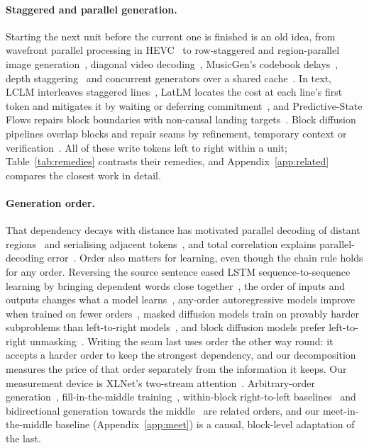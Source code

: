 \documentclass{article}
\theoremstyle{definition}
\theoremstyle{remark}
\begin{document}
\paragraph{Staggered and parallel generation.}
Starting the next unit before the current one is finished is an old idea, from wavefront parallel processing in HEVC~\citep{sullivan2012hevc} to row-staggered and region-parallel image generation~\citep{he2025zipar,wang2025par}, diagonal video decoding~\citep{ye2025diagonal}, MusicGen's codebook delays~\citep{copet2023musicgen}, depth staggering~\citep{cutler2025stagformer} and concurrent generators over a shared cache~\citep{rodionov2025hogwild}.
In text, LCLM interleaves staggered lines~\citep{li2026lclm}, LatLM locates the cost at each line's first token and mitigates it by waiting or deferring commitment~\citep{zhang2026latlm}, and Predictive-State Flows repairs block boundaries with non-causal landing targets~\citep{he2026psf}.
Block diffusion pipelines overlap blocks and repair seams by refinement, temporary context or verification~\citep{arriola2025block,tsou2026tecop,tian2026flowblock,jin2026multibd,ren2026asynclane,chavan2026lafa}.
All of these write tokens left to right within a unit; Table~\ref{tab:remedies} contrasts their remedies, and Appendix~\ref{app:related} compares the closest work in detail.

\paragraph{Generation order.}
That dependency decays with distance has motivated parallel decoding of distant regions~\citep{wang2025par,he2025zipar} and serialising adjacent tokens~\citep{li2025refusion}, and total correlation explains parallel-decoding error~\citep{zhang2026generation}.
Order also matters for learning, even though the chain rule holds for any order.
Reversing the source sentence eased LSTM sequence-to-sequence learning by bringing dependent words close together~\citep{sutskever2014seq2seq}, the order of inputs and outputs changes what a model learns~\citep{vinyals2016order}, any-order autoregressive models improve when trained on fewer orders~\citep{shih2022aoarm}, masked diffusion models train on provably harder subproblems than left-to-right models~\citep{kim2025trainworst}, and block diffusion models prefer left-to-right unmasking~\citep{hou2026rethinking}.
Writing the seam last uses order the other way round: it accepts a harder order to keep the strongest dependency, and our decomposition measures the price of that order separately from the information it keeps.
Our measurement device is XLNet's two-stream attention~\citep{yang2019xlnet}.
Arbitrary-order generation~\citep{pannatier2024sigma}, fill-in-the-middle training~\citep{bavarian2022fim}, within-block right-to-left baselines~\citep{yao2026orderagnostic} and bidirectional generation towards the middle~\citep{zhou2019bothsides,zhou2019sbnmt,zhang2020interleaved,nguyen2023meet} are related orders, and our meet-in-the-middle baseline (Appendix~\ref{app:meet}) is a causal, block-level adaptation of the last.
\end{document}
